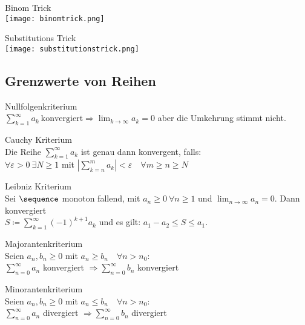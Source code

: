 \begin{KR}{Binom Trick}\\
    \texttt{[image: binomtrick.png]}
\end{KR}
\begin{KR}{Substitutions Trick}\\
    \texttt{[image: substitutionstrick.png]}
\end{KR}


\subsection{Grenzwerte von Reihen}

\begin{concept} {Nullfolgenkriterium}\\
    $\sum_{k=1}^\infty a_k~\text{konvergiert} \Rightarrow \lim_{k \to \infty} a_k = 0$ aber die Umkehrung stimmt nicht.
\end{concept}
\begin{concept} {Cauchy Kriterium}\\
    Die Reihe $\sum_{k=1}^\infty a_k$ ist genau dann konvergent, falls:\\
    $\forall \varepsilon > 0 ~\exists N \geq 1$ mit $\left|\sum_{k=n}^m a_k \right| < \varepsilon \quad \forall m \geq n \geq N$
\end{concept}
\begin{concept} {Leibniz Kriterium}\\
    Sei $\sequence$ monoton fallend, mit $a_n \geq 0~\forall n \geq 1$ und $\lim_{n \to \infty} a_n = 0$. Dann konvergiert\\
    $S \coloneqq \sum_{k = 1}^{\infty} (-1)^{k+1} a_k$
    und es gilt: $a_1 - a_2 \leq S \leq a_1$.
\end{concept}
\begin{concept} {Majorantenkriterium}\\
    Seien $a_n, b_n \geq 0$ mit $a_n \geq b_n \quad \forall n > n_0$:\\
    $\sum_{n=0}^\infty a_n$ konvergiert $\Rightarrow \sum_{n=0}^\infty b_n$ konvergiert 
\end{concept}
\begin{concept} {Minorantenkriterium}\\
    Seien $a_n, b_n \geq 0$ mit $a_n \leq b_n \quad \forall n > n_0$:\\
    $\sum_{n=0}^\infty a_n$ divergiert $\Rightarrow \sum_{n=0}^\infty b_n$ divergiert 
\end{concept}
